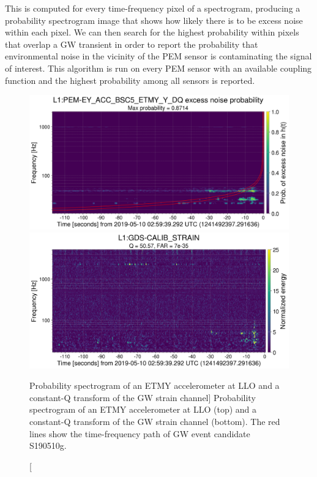 This is computed for every time-frequency pixel of a spectrogram, producing a probability spectrogram image that shows how likely there is to be excess noise within each pixel.
We can then search for the highest probability within pixels that overlap a \ac{GW} transient in order to report the probability that environmental noise in the vicinity of the \ac{PEM} sensor is contaminating the signal of interest.
This algorithm is run on every \ac{PEM} sensor with an available coupling function and the highest probability among all sensors is reported.

\begin{figure}[h!]
	\includegraphics[width=\textwidth]{figures/noise-studies/vetting-spectrogram1.png}
	\includegraphics[width=\textwidth]{figures/noise-studies/vetting-spectrogram2.png}
	\caption
	[Probability spectrogram of an ETMY accelerometer at LLO and a constant-Q transform of the GW strain channel]
	{
		Probability spectrogram of an ETMY accelerometer at LLO (top) and a constant-Q transform of the GW strain channel (bottom).
		The red lines show the time-frequency path of GW event candidate S190510g.}
	\label{fig:vetting-spectrograms}
\end{figure}

